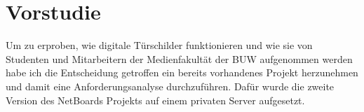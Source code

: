 \chapter{Vorstudie}\label{Vorstudie}
Um zu erproben, wie digitale Türschilder funktionieren und wie sie von Studenten und Mitarbeitern der Medienfakultät der BUW aufgenommen werden habe ich die Entscheidung getroffen ein bereits vorhandenes Projekt herzunehmen und damit eine Anforderungsanalyse durchzuführen.
Dafür wurde die zweite Version des NetBoards Projekts\cite{netboards:website} auf einem privaten Server aufgesetzt.

